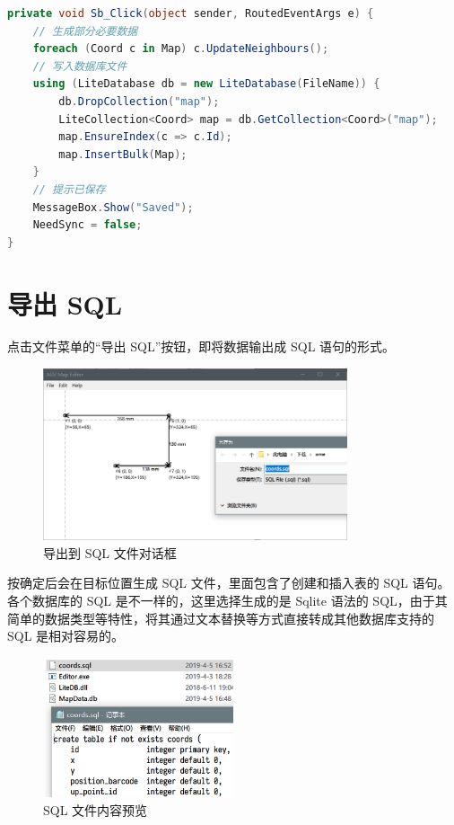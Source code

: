 \begin{lstlisting}[language=cs]
private void Sb_Click(object sender, RoutedEventArgs e) {
    // 生成部分必要数据
    foreach (Coord c in Map) c.UpdateNeighbours();
    // 写入数据库文件
    using (LiteDatabase db = new LiteDatabase(FileName)) {
        db.DropCollection("map");
        LiteCollection<Coord> map = db.GetCollection<Coord>("map");
        map.EnsureIndex(c => c.Id);
        map.InsertBulk(Map);
    }
    // 提示已保存
    MessageBox.Show("Saved");
    NeedSync = false;
}
\end{lstlisting}

\section{导出 SQL}

点击文件菜单的``导出 SQL''按钮，即将数据输出成 SQL 语句的形式。

\begin{figure}[H]
  \centering
  \includegraphics[width=0.8\textwidth]{assets/export.png}
  \caption{导出到 SQL 文件对话框}
  \label{fig:export}
\end{figure}

按确定后会在目标位置生成 SQL 文件，里面包含了创建和插入表的 SQL 语句。各个数据库的 SQL 是不一样的，这里选择生成的是 Sqlite 语法的 SQL，由于其简单的数据类型等特性，将其通过文本替换等方式直接转成其他数据库支持的 SQL 是相对容易的。

\begin{figure}[H]
  \centering
  \includegraphics[width=0.5\textwidth]{assets/sql.png}
  \caption{SQL 文件内容预览}
  \label{fig:sql}
\end{figure}

